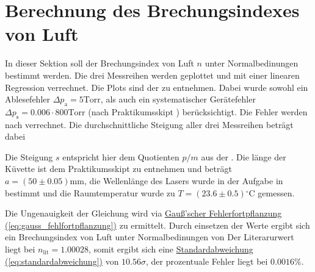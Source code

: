 \section[Brechungsindex von Luft]{Berechnung des Brechungsindexes von Luft}
\label{sec:A2}
In dieser Sektion soll der Brechungsindex von Luft $n$ unter Normalbedinungen bestimmt werden. Die drei Messreihen werden geplottet und mit einer linearen Regression verrechnet. Die Plots sind der  zu entnehmen.
Dabei wurde sowohl ein Ablesefehler $\Delta p_\text{a} = 5 \mathrm{Torr}$, als auch ein systematischer Gerätefehler $\Delta p_\text{s} = 0.006 \cdot 800 \mathrm{Torr}$ (nach Praktikumsskipt \cite{skriptPAP21}) berücksichtigt. Die Fehler werden nach  verrechnet. 
Die durchschnittliche Steigung aller drei Messreihen beträgt dabei 

Die Steigung $s$ entspricht hier dem Quotienten $p/m$ aus der . Die länge der Küvette ist dem Praktikumsskipt zu entnehmen und beträgt $a = (50 \pm 0.05) \mathrm{mm}$, die Wellenlänge des Lasers wurde in der Aufgabe in  bestimmt und die Raumtemperatur wurde zu $T = (23.6 \pm 0.5)\mathrm{^\circ C}$ gemessen.

Die Ungenauigkeit der Gleichung wird via \hyperref[eq:gauss_fehlfortpflanzung]{Gauß'scher Fehlerfortpflanzung (\ref*{eq:gauss_fehlfortpflanzung})} zu
ermittelt. Durch einsetzen der Werte ergibt sich ein Brechungsindex von Luft unter Normalbedinungen von
Der Literarurwert liegt bei $n_\text{lit} = 1.00028$, somit ergibt sich eine \hyperref[eq:standardabweichung]{Standardabweichung (\ref*{eq:standardabweichung})} von $10.56 \sigma$, der prozentuale Fehler liegt bei $0.0016\%$. 


